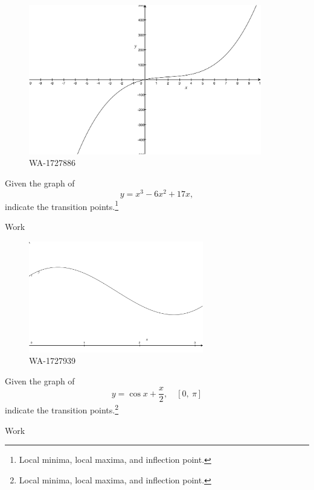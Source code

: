 \documentclass[12pt,addpoints, answers, fleqn]{exam}
\begin{document}
\begin{teacher}
\begin{questions}
\begin{figure}[htbp] %
   \centering
   \includegraphics[width=4in]{./graphics/1727886.pdf} 
   \caption{WA-1727886}
   \label{fig:1727886}
\end{figure}

Given the graph of
\[
y = x^3 - 6x^2 + 17x,
\]
indicate the transition points.\footnote{Local minima, local maxima, and inflection point.}

\begin{solution}
Work
\end{solution}

\question 	%

\begin{figure}[htbp] %
   \centering
   \includegraphics[width=3in]{./graphics/1727939.pdf} 
   \caption{WA-1727939}
   \label{fig:1727939}
\end{figure}

Given the graph of
\[
y=\cos x + \frac{x}{2}, \quad \left[ 0, \ \pi \right]
\]
indicate the transition points.\footnote{Local minima, local maxima, and inflection point.}

\begin{solution}
Work
\end{solution}

\question 	%


\end{questions}
\end{teacher}
\end{document}

